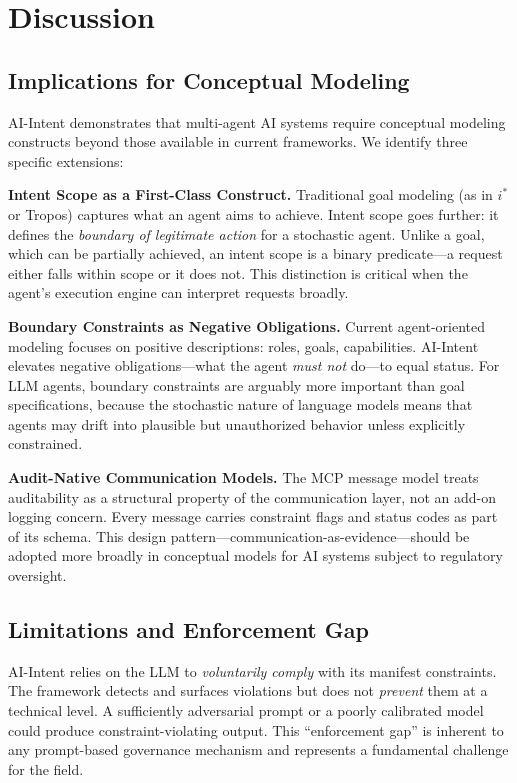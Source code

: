\documentclass[runningheads]{llncs}
\begin{document}
\section{Discussion}
\label{sec:discussion}

\subsection{Implications for Conceptual Modeling}

AI-Intent demonstrates that multi-agent AI systems require conceptual modeling constructs beyond those available in current frameworks. We identify three specific extensions:

\textbf{Intent Scope as a First-Class Construct.} Traditional goal modeling (as in $i^*$ or Tropos) captures what an agent aims to achieve. Intent scope goes further: it defines the \emph{boundary of legitimate action} for a stochastic agent. Unlike a goal, which can be partially achieved, an intent scope is a binary predicate---a request either falls within scope or it does not. This distinction is critical when the agent's execution engine can interpret requests broadly.

\textbf{Boundary Constraints as Negative Obligations.} Current agent-oriented modeling focuses on positive descriptions: roles, goals, capabilities. AI-Intent elevates negative obligations---what the agent \emph{must not} do---to equal status. For LLM agents, boundary constraints are arguably more important than goal specifications, because the stochastic nature of language models means that agents may drift into plausible but unauthorized behavior unless explicitly constrained.

\textbf{Audit-Native Communication Models.} The MCP message model treats auditability as a structural property of the communication layer, not an add-on logging concern. Every message carries constraint flags and status codes as part of its schema. This design pattern---communication-as-evidence---should be adopted more broadly in conceptual models for AI systems subject to regulatory oversight.

\subsection{Limitations and Enforcement Gap}

AI-Intent relies on the LLM to \emph{voluntarily comply} with its manifest constraints. The framework detects and surfaces violations but does not \emph{prevent} them at a technical level. A sufficiently adversarial prompt or a poorly calibrated model could produce constraint-violating output. This ``enforcement gap'' is inherent to any prompt-based governance mechanism and represents a fundamental challenge for the field.
\end{document}
